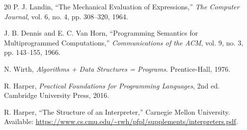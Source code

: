 \documentclass[conference]{IEEEtran}
\begin{document}
\begin{thebibliography}{20}
P. J. Landin,
``The Mechanical Evaluation of Expressions,''
\emph{The Computer Journal},
vol. 6, no. 4, pp. 308--320, 1964.

J. B. Dennis and E. C. Van Horn,
``Programming Semantics for Multiprogrammed Computations,''
\emph{Communications of the ACM},
vol. 9, no. 3, pp. 143--155, 1966.

N. Wirth,
\emph{Algorithms + Data Structures = Programs}.
Prentice-Hall, 1976.

R. Harper,
\emph{Practical Foundations for Programming Languages},
2nd ed. Cambridge University Press, 2016.

R. Harper,
``The Structure of an Interpreter,''
Carnegie Mellon University.
Available: \url{https://www.cs.cmu.edu/~rwh/pfpl/supplements/interpreters.pdf}.

\end{thebibliography}
\end{document}
